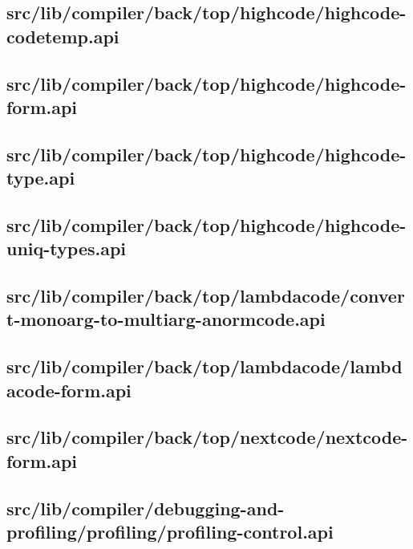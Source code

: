 \subsection{src/lib/compiler/back/top/highcode/highcode-codetemp.api}


\subsection{src/lib/compiler/back/top/highcode/highcode-form.api}


\subsection{src/lib/compiler/back/top/highcode/highcode-type.api}


\subsection{src/lib/compiler/back/top/highcode/highcode-uniq-types.api}


\subsection{src/lib/compiler/back/top/lambdacode/convert-monoarg-to-multiarg-anormcode.api}


\subsection{src/lib/compiler/back/top/lambdacode/lambdacode-form.api}


\subsection{src/lib/compiler/back/top/nextcode/nextcode-form.api}


\subsection{src/lib/compiler/debugging-and-profiling/profiling/profiling-control.api}


